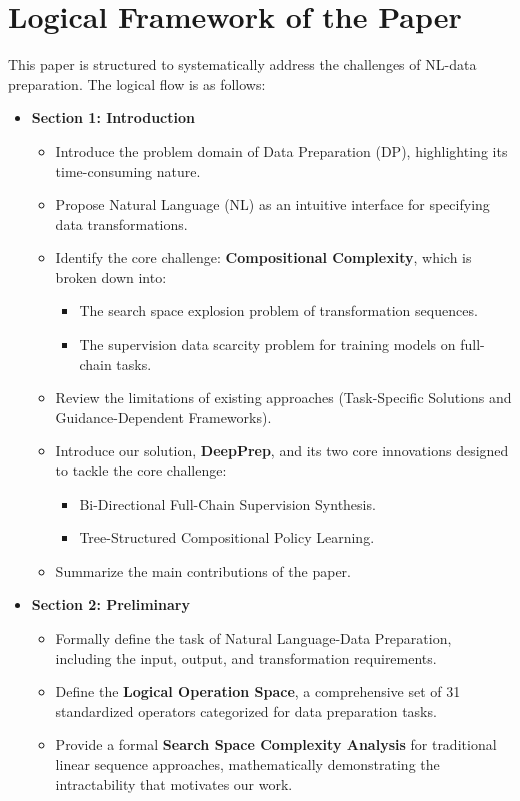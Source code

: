 \section{Logical Framework of the Paper}
\label{sec:logical_framework}

This paper is structured to systematically address the challenges of NL-\nlwhat data preparation. The logical flow is as follows:

\begin{itemize}
    \item \textbf{Section 1: Introduction}
    \begin{itemize}
        \item Introduce the problem domain of Data Preparation (DP), highlighting its time-consuming nature.
        \item Propose Natural Language (NL) as an intuitive interface for specifying data transformations.
        \item Identify the core challenge: \textbf{Compositional Complexity}, which is broken down into:
        \begin{itemize}
            \item The search space explosion problem of transformation sequences.
            \item The supervision data scarcity problem for training models on full-chain tasks.
        \end{itemize}
        \item Review the limitations of existing approaches (Task-Specific Solutions and Guidance-Dependent Frameworks).
        \item Introduce our solution, \textbf{DeepPrep}, and its two core innovations designed to tackle the core challenge:
        \begin{itemize}
            \item Bi-Directional Full-Chain Supervision Synthesis.
            \item Tree-Structured Compositional Policy Learning.
        \end{itemize}
        \item Summarize the main contributions of the paper.
    \end{itemize}

    \item \textbf{Section 2: Preliminary}
    \begin{itemize}
        \item Formally define the task of Natural Language-\nlwhat Data Preparation, including the input, output, and transformation requirements.
        \item Define the \textbf{Logical Operation Space}, a comprehensive set of 31 standardized operators categorized for data preparation tasks.
        \item Provide a formal \textbf{Search Space Complexity Analysis} for traditional linear sequence approaches, mathematically demonstrating the intractability that motivates our work.
    \end{itemize}


\end{itemize}

